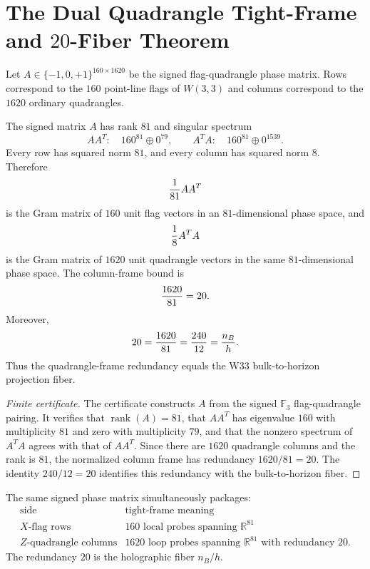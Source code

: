 
\section{The Dual Quadrangle Tight-Frame and $20$-Fiber Theorem}
\label{sec:dual-quadrangle-tight-frame}

Let $A\in\{-1,0,+1\}^{160\times1620}$ be the signed flag-quadrangle phase matrix.
Rows correspond to the $160$ point-line flags of $W(3,3)$ and columns correspond to
the $1620$ ordinary quadrangles.

\begin{theorem}
The signed matrix $A$ has rank $81$ and singular spectrum
\[
        A A^T: \quad 160^{81}\oplus0^{79},
        \qquad
        A^T A: \quad 160^{81}\oplus0^{1539}.
\]
Every row has squared norm $81$, and every column has squared norm $8$.
Therefore
\[
        {1\over81}AA^T
\]
is the Gram matrix of $160$ unit flag vectors in an $81$-dimensional phase space,
and
\[
        {1\over8}A^T A
\]
is the Gram matrix of $1620$ unit quadrangle vectors in the same $81$-dimensional
phase space.  The column-frame bound is
\[
        {1620\over81}=20.
\]
Moreover,
\[
        20={1620\over81}={240\over12}={n_B\over h}.
\]
Thus the quadrangle-frame redundancy equals the W33 bulk-to-horizon projection fiber.
\end{theorem}

\begin{proof}[Finite certificate]
The certificate constructs $A$ from the signed $\mathbb F_3$ flag-quadrangle pairing.
It verifies that $\operatorname{rank}(A)=81$, that $AA^T$ has eigenvalue $160$ with
multiplicity $81$ and zero with multiplicity $79$, and that the nonzero spectrum of
$A^TA$ agrees with that of $AA^T$.  Since there are $1620$ quadrangle columns and the
rank is $81$, the normalized column frame has redundancy $1620/81=20$.  The identity
$240/12=20$ identifies this redundancy with the bulk-to-horizon fiber.
\end{proof}

\begin{corollary}
The same signed phase matrix simultaneously packages:
\[
\begin{array}{c|c}
\text{side} & \text{tight-frame meaning}\\
\hline
X\text{-flag rows} & 160\text{ local probes spanning }\mathbb R^{81}\\
Z\text{-quadrangle columns} & 1620\text{ loop probes spanning }\mathbb R^{81}\text{ with redundancy }20.
\end{array}
\]
The redundancy $20$ is the holographic fiber $n_B/h$.
\end{corollary}
